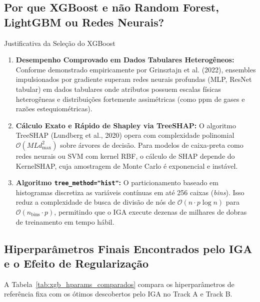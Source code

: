 \documentclass[11pt,a4paper]{article}
\begin{document}
\subsection{Por que XGBoost e não Random Forest, LightGBM ou Redes Neurais?}
\begin{decisionBox}{Justificativa da Seleção do XGBoost}
\begin{enumerate}[leftmargin=0.8cm]
  \item \textbf{Desempenho Comprovado em Dados Tabulares Heterogêneos:} Conforme demonstrado empiricamente por Grinsztajn et al. (2022), ensembles impulsionados por gradiente superam redes neurais profundas (MLP, ResNet tabular) em dados tabulares onde atributos possuem escalas físicas heterogêneas e distribuições fortemente assimétricas (como ppm de gases e razões estequiométricas).
  \item \textbf{Cálculo Exato e Rápido de Shapley via TreeSHAP:} O algoritmo TreeSHAP (Lundberg et al., 2020) opera com complexidade polinomial $\mathcal{O}(M L d_{\max}^2)$ sobre árvores de decisão. Para modelos de caixa-preta como redes neurais ou SVM com kernel RBF, o cálculo de SHAP depende do KernelSHAP, cuja amostragem de Monte Carlo é exponencial e instável.
  \item \textbf{Algoritmo \texttt{tree\_method="hist"}:} O particionamento baseado em histogramas discretiza as variáveis contínuas em até 256 caixas (\textit{bins}). Isso reduz a complexidade de busca de divisão de nós de $\mathcal{O}(n \cdot p \log n)$ para $\mathcal{O}(n_{\text{bins}} \cdot p)$, permitindo que o IGA execute dezenas de milhares de dobras de treinamento em tempo hábil.
\end{enumerate}
\end{decisionBox}

\subsection{Hiperparâmetros Finais Encontrados pelo IGA e o Efeito de Regularização}
A Tabela~\ref{tab:xgb_hparams_comparados} compara os hiperparâmetros de referência fixa com os ótimos descobertos pelo IGA no Track A e Track B.
\end{document}
